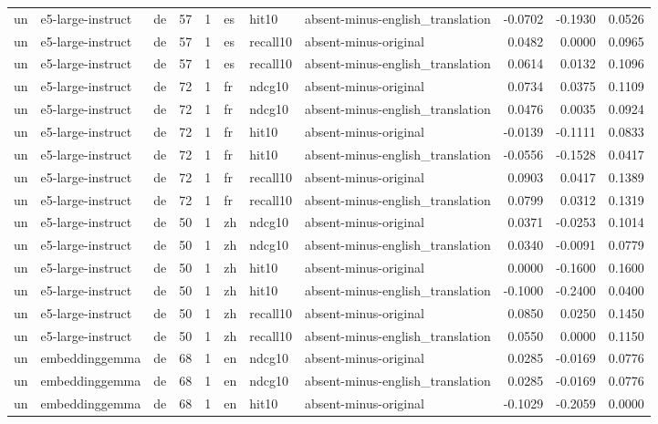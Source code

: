 \begin{tabular}{lllrrlllrrr}
un & e5-large-instruct & de & 57 & 1 & es & hit10 & absent-minus-english\_translation & -0.0702 & -0.1930 & 0.0526 \\
un & e5-large-instruct & de & 57 & 1 & es & recall10 & absent-minus-original & 0.0482 & 0.0000 & 0.0965 \\
un & e5-large-instruct & de & 57 & 1 & es & recall10 & absent-minus-english\_translation & 0.0614 & 0.0132 & 0.1096 \\
un & e5-large-instruct & de & 72 & 1 & fr & ndcg10 & absent-minus-original & 0.0734 & 0.0375 & 0.1109 \\
un & e5-large-instruct & de & 72 & 1 & fr & ndcg10 & absent-minus-english\_translation & 0.0476 & 0.0035 & 0.0924 \\
un & e5-large-instruct & de & 72 & 1 & fr & hit10 & absent-minus-original & -0.0139 & -0.1111 & 0.0833 \\
un & e5-large-instruct & de & 72 & 1 & fr & hit10 & absent-minus-english\_translation & -0.0556 & -0.1528 & 0.0417 \\
un & e5-large-instruct & de & 72 & 1 & fr & recall10 & absent-minus-original & 0.0903 & 0.0417 & 0.1389 \\
un & e5-large-instruct & de & 72 & 1 & fr & recall10 & absent-minus-english\_translation & 0.0799 & 0.0312 & 0.1319 \\
un & e5-large-instruct & de & 50 & 1 & zh & ndcg10 & absent-minus-original & 0.0371 & -0.0253 & 0.1014 \\
un & e5-large-instruct & de & 50 & 1 & zh & ndcg10 & absent-minus-english\_translation & 0.0340 & -0.0091 & 0.0779 \\
un & e5-large-instruct & de & 50 & 1 & zh & hit10 & absent-minus-original & 0.0000 & -0.1600 & 0.1600 \\
un & e5-large-instruct & de & 50 & 1 & zh & hit10 & absent-minus-english\_translation & -0.1000 & -0.2400 & 0.0400 \\
un & e5-large-instruct & de & 50 & 1 & zh & recall10 & absent-minus-original & 0.0850 & 0.0250 & 0.1450 \\
un & e5-large-instruct & de & 50 & 1 & zh & recall10 & absent-minus-english\_translation & 0.0550 & 0.0000 & 0.1150 \\
un & embeddinggemma & de & 68 & 1 & en & ndcg10 & absent-minus-original & 0.0285 & -0.0169 & 0.0776 \\
un & embeddinggemma & de & 68 & 1 & en & ndcg10 & absent-minus-english\_translation & 0.0285 & -0.0169 & 0.0776 \\
un & embeddinggemma & de & 68 & 1 & en & hit10 & absent-minus-original & -0.1029 & -0.2059 & 0.0000 \\

\end{tabular}

